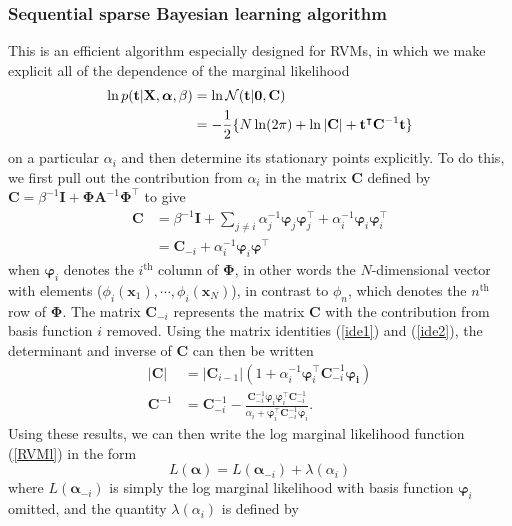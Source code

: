 \documentclass[a4paper]{book}
\newcommand{\up}{\mathrm}
\renewcommand{\bf}{\mathbf}
\renewcommand{\cal}{\mathcal}
\newcommand{\bs}{\boldsymbol}
\begin{document}
\subsubsection{Sequential sparse Bayesian learning algorithm} \label{SSBL}
This is an efficient algorithm especially designed for RVMs, in which we make explicit all of the dependence of the marginal likelihood
\begin{align}
	\ln p(\bf{t}|\bf{X},\bs{\alpha},\beta) &= \ln \cal{N}(\bf{t}|\bf{0,C})\notag\\
	&= -\frac{1}{2} \{ N \ln(2\pi) + \ln |\bf{C}| + \bf{t}^{\intercal}\bf{C}^{-1}\bf{t} \} \label{RVMl}
\end{align}
on a particular $\alpha_i$ and then determine its stationary points explicitly. To do this, we first pull out the contribution from $\alpha_i$ in the matrix $\bf{C}$ defined by $\bf{C} = \beta^{-1} \bf{I}+\bf{\Phi}\bf{A}^{-1}\bf{\Phi}^{\intercal}$ to give
\begin{align}
	\bf{C} &= \beta^{-1} \bf{I} + \sum_{j \neq i} \alpha_j^{-1} \bs{\varphi}_j \bs{\varphi}_j^{\intercal} + \alpha_i^{-1} \bs{\varphi}_i \bs{\varphi}_i^{\intercal}\\
	&= \bf{C}_{-i} + \alpha_i^{-1} \bs{\varphi}_i \bs{\varphi}^{\intercal}
\end{align}
when $\bs{\varphi}_i$ denotes the $i^{\up{th}}$ column of $\bs{\Phi}$, in other words the $N$-dimensional vector with elements ($\phi_i(\bf{x}_1),\cdots,\phi_i(\bf{x}_N)$), in contrast to $\phi_n$, which denotes the $n^{\up{th}}$ row of $\bf{\Phi}$. The matrix $\bf{C}_{-i}$ represents the matrix $\bf{C}$ with the contribution from basis function $i$ removed. Using the matrix identities (\ref{ide1}) and (\ref{ide2}), the determinant and inverse of $\bf{C}$ can then be written
\begin{align}
	|\bf{C}| &= |\bf{C}_{i-1}|(1+\alpha_i^{-1}\bs{\varphi}_i^{\intercal}\bf{C}_{-i}^{-1}\bs{\varphi_i})\\
	\bf{C}^{-1} &= \bf{C}_{-i}^{-1} - \frac{\bf{C}_{-i}^{-1}\bs{\varphi}_i \bs{\varphi}_i^{\intercal}\bf{C}_{-i}^{-1}}{\alpha_i+\bs{\varphi}_i^{\intercal}\bf{C}_{-i}^{-1}\bs{\varphi}_i}.
\end{align}
Using these results, we can then write the log marginal likelihood function (\ref{RVMl}) in the form
\begin{equation}
	L(\bs{\alpha}) = L(\bs{\alpha}_{-i})+\lambda(\alpha_i)
\end{equation}
where $L(\bs{\alpha}_{-i})$ is simply the log marginal likelihood with basis function $\bs{\varphi}_i$ omitted, and the quantity $\lambda(\alpha_i)$ is defined by
\end{document}
